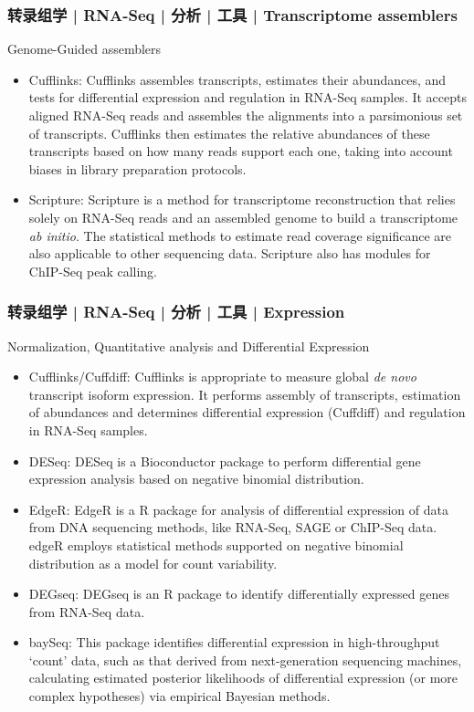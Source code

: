 \begin{frame}
  \frametitle{转录组学 | RNA-Seq | 分析 | 工具 | Transcriptome assemblers}
  \begin{block}{Genome-Guided assemblers}
    \begin{itemize}
      \item Cufflinks: Cufflinks assembles transcripts, estimates their abundances, and tests for differential expression and regulation in RNA-Seq samples. It accepts aligned RNA-Seq reads and assembles the alignments into a parsimonious set of transcripts. Cufflinks then estimates the relative abundances of these transcripts based on how many reads support each one, taking into account biases in library preparation protocols.
      \item Scripture: Scripture is a method for transcriptome reconstruction that relies solely on RNA-Seq reads and an assembled genome to build a transcriptome \textit{ab initio}. The statistical methods to estimate read coverage significance are also applicable to other sequencing data. Scripture also has modules for ChIP-Seq peak calling.
    \end{itemize}
  \end{block}
\end{frame}

\begin{frame}
  \frametitle{转录组学 | RNA-Seq | 分析 | 工具 | Expression}
  {\footnotesize
  \begin{block}{Normalization, Quantitative analysis and Differential Expression}
    \begin{itemize}
      \item Cufflinks/Cuffdiff: Cufflinks is appropriate to measure global \textit{de novo} transcript isoform expression. It performs assembly of transcripts, estimation of abundances and determines differential expression (Cuffdiff) and regulation in RNA-Seq samples.
      \item DESeq: DESeq is a Bioconductor package to perform differential gene expression analysis based on negative binomial distribution.
      \item EdgeR: EdgeR is a R package for analysis of differential expression of data from DNA sequencing methods, like RNA-Seq, SAGE or ChIP-Seq data. edgeR employs statistical methods supported on negative binomial distribution as a model for count variability.
      \item DEGseq: DEGseq is an R package to identify differentially expressed genes from RNA-Seq data.
      \item baySeq: This package identifies differential expression in high-throughput `count' data, such as that derived from next-generation sequencing machines, calculating estimated posterior likelihoods of differential expression (or more complex hypotheses) via empirical Bayesian methods.
    \end{itemize}
  \end{block}
}
\end{frame}

